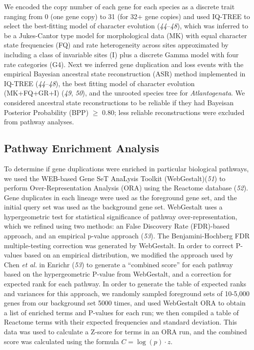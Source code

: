 \documentclass[]{elsarticle} %
\begin{document}
We encoded the copy number of each gene for each species as a discrete trait ranging from 0 (one gene copy) to 31 (for 32+ gene copies) and used IQ-TREE to select the best-fitting model of character evolution (\emph{44}--\emph{48}), which was inferred to be a Jukes-Cantor type model for morphological data (MK) with equal character state frequencies (FQ) and rate heterogeneity across sites approximated by including a class of invariable sites (I) plus a discrete Gamma model with four rate categories (G4). Next we inferred gene duplication and loss events with the empirical Bayesian ancestral state reconstruction (ASR) method implemented in IQ-TREE (\emph{44}--\emph{48}), the best fitting model of character evolution (MK+FQ+GR+I) (\emph{49}, \emph{50}), and the unrooted species tree for \emph{Atlantogenata}. We considered ancestral state reconstructions to be reliable if they had Bayeisan Posterior Probability (BPP) \(\geq\) 0.80; less reliable reconstructions were excluded from pathway analyses.

\hypertarget{pathway-enrichment-analysis}{%
\subsection{Pathway Enrichment Analysis}\label{pathway-enrichment-analysis}}

To determine if gene duplications were enriched in particular biological pathways, we used the WEB-based Gene SeT AnaLysis Toolkit (WebGestalt)(\emph{51}) to perform Over-Representation Analysis (ORA) using the Reactome database (\emph{52}). Gene duplicates in each lineage were used as the foreground gene set, and the initial query set was used as the background gene set. WebGestalt uses a hypergeometric test for statistical significance of pathway over-representation, which we refined using two methods: an False Discovery Rate (FDR)-based approach, and an empirical p-value approach (\emph{53}). The Benjamini-Hochberg FDR multiple-testing correction was generated by WebGestalt. In order to correct P-values based on an empirical distribution, we modified the approach used by Chen \emph{et al.} in Enrichr (\emph{53}) to generate a ``combined score'' for each pathway based on the hypergeometric P-value from WebGestalt, and a correction for expected rank for each pathway. In order to generate the table of expected ranks and variances for this approach, we randomly sampled foreground sets of 10-5,000 genes from our background set 5000 times, and used WebGestalt ORA to obtain a list of enriched terms and P-values for each run; we then compiled a table of Reactome terms with their expected frequencies and standard deviation. This data was used to calculate a Z-score for terms in an ORA run, and the combined score was calculated using the formula \(C = \log{(p)}\cdot{}z\).
\end{document}
